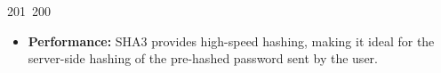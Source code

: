 201~200~\documentclass{article}
\begin{document}
	                                                                                                                                                                                                                                                                                                	                                                                                                                                        	    	                                                                                                	                                                                                                                                                                                                                                                                                                                                	                                                                        	                                                                        	                                                                                                                                        	                                                                        \begin{itemize}
	                                                                                                                                                                                                                                                                                                	                                                                                                                                        	    	                                                                                                	                                                                                                                                                                                                                                                                                                                                	                                                                        	                                                                        	                                                                                                                                        	                                                                            \item \textbf{Performance:} SHA3 provides high-speed hashing, making it ideal for the server-side hashing of the pre-hashed password sent by the user.

\end{itemize}
\end{document}
